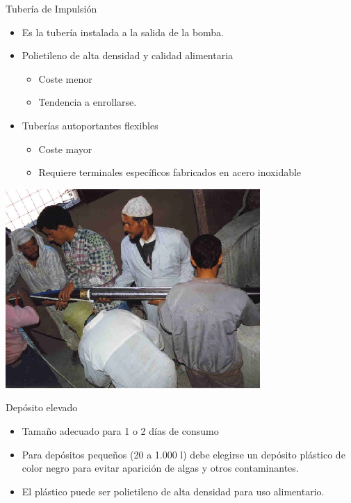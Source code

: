 \documentclass[xcolor={usenames,svgnames,dvipsnames}]{beamer}
\begin{document}
\begin{frame}[label={sec:org77022a2}]{Tubería de Impulsión}
\begin{itemize}
\item Es la tubería instalada a la salida de la bomba.

\item Polietileno de alta densidad y calidad alimentaria

\begin{itemize}
\item Coste menor

\item Tendencia a enrollarse.
\end{itemize}

\item Tuberías autoportantes flexibles

\begin{itemize}
\item Coste mayor

\item Requiere terminales específicos fabricados en acero inoxidable
\end{itemize}
\end{itemize}
\end{frame}

\begin{frame}[label={sec:org31128bc}]{}
\begin{center}
\includegraphics[width=.9\linewidth]{../figs/Marruecos4.png}
\end{center}
\end{frame}


\begin{frame}[label={sec:orga66110c}]{Depósito elevado}
\begin{itemize}
\item \alert{Tamaño adecuado para 1 o 2 días de consumo}
\item Para depósitos pequeños (20 a 1.000 l) debe elegirse un \alert{depósito plástico de color negro}  para evitar aparición de algas y otros contaminantes.
\item El plástico puede ser polietileno de alta densidad para uso alimentario.
\end{itemize}
\end{frame}
\end{document}
